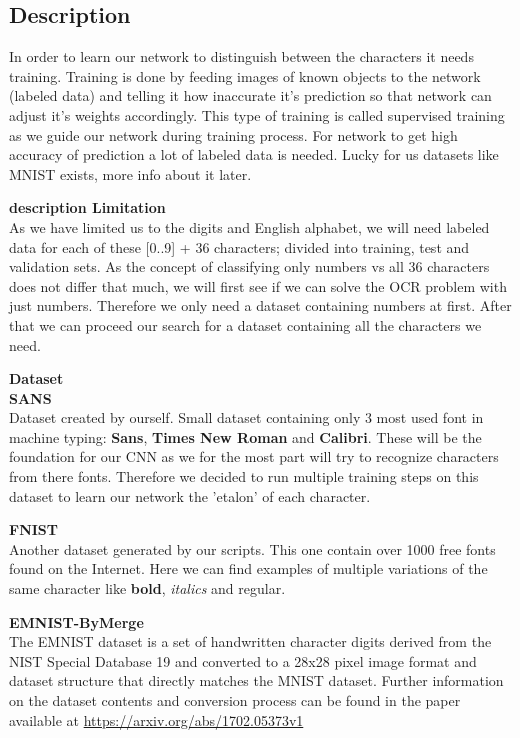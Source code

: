 \documentclass[Report.tex]{subfiles}
\begin{document}
\subsection{Description}

\begin{flushleft}
  In order to learn our network to distinguish between the characters it needs training. Training is done by feeding images of known objects to the network (labeled data) and telling it how inaccurate it's prediction so that network can adjust it's weights accordingly. This type of training is called supervised training as we guide our network during training process.
  For network to get high accuracy of prediction a lot of labeled data is needed. Lucky for us datasets like MNIST exists, more info about it later.
\end{flushleft}

\textbf{description Limitation} \\
As we have limited us to the digits and English alphabet, we will need labeled data for each of these [0..9] + 36 characters; divided into training, test and validation sets. As the concept of classifying only numbers vs all 36 characters does not differ that much, we will first see if we can solve the OCR problem with just numbers. Therefore we only need a dataset containing numbers at first. After that we can proceed our search for a dataset containing all the characters we need. \\

\begin{flushleft}
  \textbf{Dataset} \\
  \textbf{SANS} \\
  Dataset created by ourself.
  Small dataset containing only 3 most used font in machine typing:
  \textbf{Sans}, \textbf{Times New Roman} and \textbf{Calibri}. These will be the foundation for our CNN as we for the most part will try to recognize characters from there fonts. Therefore we decided to run multiple training steps on this dataset to learn our network the 'etalon' of each character.
  
  \textbf{FNIST} \\
  Another dataset generated by our scripts. This one contain over 1000 free fonts found on the Internet. Here we can find examples of multiple variations of the  same character like \textbf{bold}, \textit{italics} and regular.
  
  \textbf{EMNIST-ByMerge} \\
  The EMNIST dataset is a set of handwritten character digits derived from the NIST Special Database 19  and converted to a 28x28 pixel image format and dataset structure that directly matches the MNIST dataset. Further information on the dataset contents and conversion process can be found in the paper available at \href{https://arxiv.org/abs/1702.05373v1}{https://arxiv.org/abs/1702.05373v1}

\end{flushleft}
\end{document}
